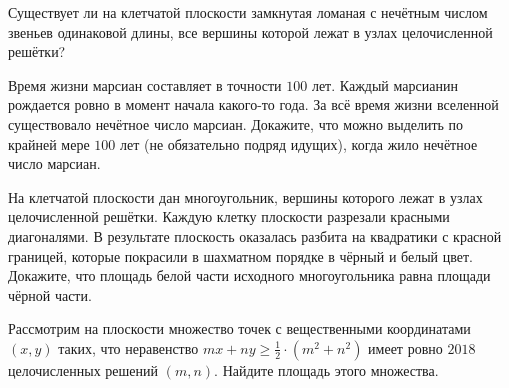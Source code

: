 \begin{problems}
\item Существует ли на клетчатой плоскости замкнутая ломаная с нечётным числом звеньев одинаковой длины, все вершины которой лежат в узлах целочисленной решётки?

\item Время жизни марсиан составляет в точности $100$ лет. Каждый марсианин рождается ровно в момент начала какого-то года. За всё время жизни вселенной существовало нечётное число марсиан. Докажите, что можно выделить по крайней мере $100$ лет (не обязательно подряд идущих), когда жило нечётное число марсиан.



\item На клетчатой плоскости дан многоугольник, вершины которого лежат в узлах целочисленной решётки. Каждую клетку плоскости разрезали красными диагоналями. В результате плоскость оказалась разбита на квадратики с красной границей, которые покрасили в шахматном порядке в чёрный и белый цвет. Докажите, что площадь белой части исходного многоугольника равна площади чёрной части.

\item Рассмотрим на плоскости множество точек с вещественными координатами $(x, y)$ таких, что неравенство $mx + ny \geqslant \frac{1}{2} \cdot (m^2 + n^2)$ имеет ровно $2018$ целочисленных решений $(m, n)$. Найдите площадь этого множества.


\end{problems}